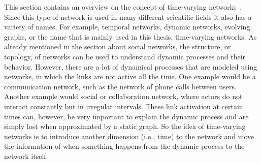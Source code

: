 This section contains an overview on the concept of time-varying networks~\cite{Holme2012, Holme2015}.
Since this type of network is used in many different scientific fields it also has a variety of names.
For example, temporal networks, dynamic networks, evolving graphs, or the name that is mainly used in this thesis, time-varying networks.
As already mentioned in the section about social networks, the structure, or topology, of networks can be used to understand dynamic processes and their behavior.
However, there are a lot of dynamical processes that are modeled using networks, in which the links are not active all the time.
One example would be a communication network, such as the network of phone calls between users.
Another example would social or collaboration network, where actors do not interact constantly but in irregular intervals.
These link activation at certain times can, however, be very important to explain the dynamic process and are simply lost when approximated by a static graph.
So the idea of time-varying networks is to introduce another dimension (i.e., time) to the network and move the information of when something happens from the dynamic process to the network itself.

